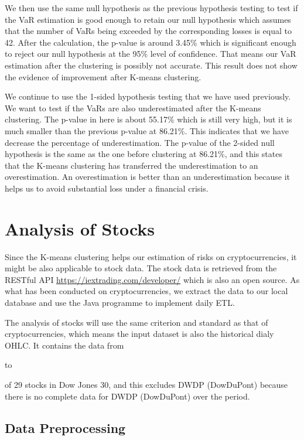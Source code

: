 \documentclass[11pt]{article} %
\theoremstyle{plain}
\theoremstyle{definition}
\begin{document}
We then use the same null hypothesis as the previous hypothesis testing to test if the VaR estimation is good enough to retain our null hypothesis which assumes that the number of VaRs being exceeded by the corresponding losses is equal to 42. After the calculation, the p-value is around 3.45\% which is significant enough to reject our null hypothesis at the 95\% level of confidence. That means our VaR estimation after the clustering is possibly not accurate. This result does not show the evidence of improvement after K-means clustering.

We continue to use the 1-sided hypothesis testing that we have used previously. We want to test if the VaRs are also underestimated after the K-means clustering. The p-value in here is about 55.17\% which is still very high, but it is much smaller than the previous p-value at 86.21\%. This indicates that we have decrease the percentage of underestimation. The p-value of the 2-sided null hypothesis is the same as the one before clustering at 86.21\%, and this states that the K-means clustering has transferred the underestimation to an overestimation. An overestimation is better than an underestimation because it helps us to avoid substantial loss under a financial crisis.

\section{Analysis of Stocks}

Since the K-means clustering helps our estimation of risks on cryptocurrencies, it might be also applicable to stock data. The stock data is retrieved from the RESTful API \url{https://iextrading.com/developer/}\cite{iextrading} which is also an open source. As what has been conducted on cryptocurrencies, we extract the data to our local database and use the Java programme to implement daily ETL.

The analysis of stocks will use the same criterion and standard as that of cryptocurrencies, which means the input dataset is also the historical dialy OHLC. It contains the data from \date{1st January 2016} to \date{31st July 2018} of 29 stocks in Dow Jones 30, and this excludes DWDP (DowDuPont) because there is no complete data for DWDP (DowDuPont) over the period.

\subsection{Data Preprocessing}
\end{document}
